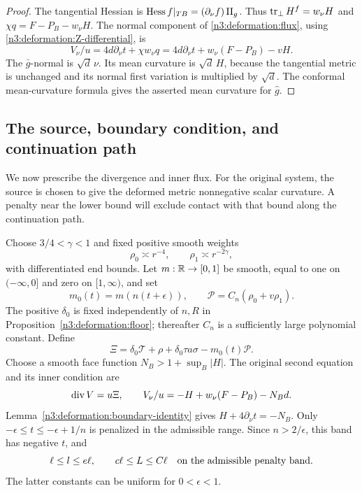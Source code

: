 \begin{proof}
The tangential Hessian is
$\operatorname{Hess} f|_{TB}=(\partial_\nu f)\operatorname{II}_g$.
Thus $\operatorname{tr}_\perp H^f=w_\nu H$ and
$\chi q=F-P_B-w_\nu H$.
The normal component of \eqref{n3:deformation:flux}, using
\eqref{n3:deformation:Z-differential}, is
\[
 V_\nu/u=4d\partial_\nu t+\chi w_\nu q
        =4d\partial_\nu t+w_\nu(F-P_B)-vH.
\]
The $\bar g$-normal is $\sqrt d\,\nu$. Its mean curvature is $\sqrt d\,H$,
because the tangential metric is unchanged and its normal first variation
is multiplied by $\sqrt d$. The conformal mean-curvature formula gives
the asserted mean curvature for $\hat g$.
\end{proof}

\subsection{The source, boundary condition, and continuation path}

We now prescribe the divergence and inner flux. For the original system,
the source is chosen to give the deformed metric nonnegative scalar
curvature. A penalty near the lower bound will exclude contact with that
bound along the continuation path.

Choose $3/4<\gamma<1$ and fixed positive smooth weights
\[
 \rho_0\asymp r^{-4},\qquad \rho_1\asymp r^{-2\gamma},
\]
with differentiated end bounds. Let $m:\mathbb R\to[0,1]$ be smooth, equal to one
on $(-\infty,0]$ and zero on $[1,\infty)$, and set
\[
 m_0(t)=m(n(t+\epsilon)),\qquad
 \mathcal P=C_n(\rho_0+v\rho_1).
\]
The positive $\delta_0$ is fixed independently of $n,R$ in
Proposition~\ref{n3:deformation:floor}; thereafter $C_n$ is a sufficiently
large polynomial constant. Define
\begin{equation}\label{n3:deformation:source}
 \Xi=\delta_0\mathcal T+\rho+\delta_0\tau a\sigma-m_0(t)\mathcal P.
\end{equation}
Choose a smooth face function $N_B>1+\sup_B|H|$.
The original second equation and its inner condition are
\begin{equation}\label{n3:deformation:original-second-equation}
 \operatorname{div} V=u\Xi,\qquad V_\nu/u=-H+w_\nu(F-P_B)-N_Bd.
\end{equation}
Lemma~\ref{n3:deformation:boundary-identity} gives
$H+4\partial_\nu t=-N_B$.
Only $-\epsilon\le t\le-\epsilon+1/n$ is penalized in the admissible range.
Since $n>2/\epsilon$, this band has negative $t$, and
\begin{equation}\label{n3:deformation:penalty-band}
 \ell\le l\le e\ell,\qquad c\ell\le L\le C\ell
 \quad\hbox{on the admissible penalty band}.
\end{equation}
The latter constants can be uniform for $0<\epsilon<1$.

